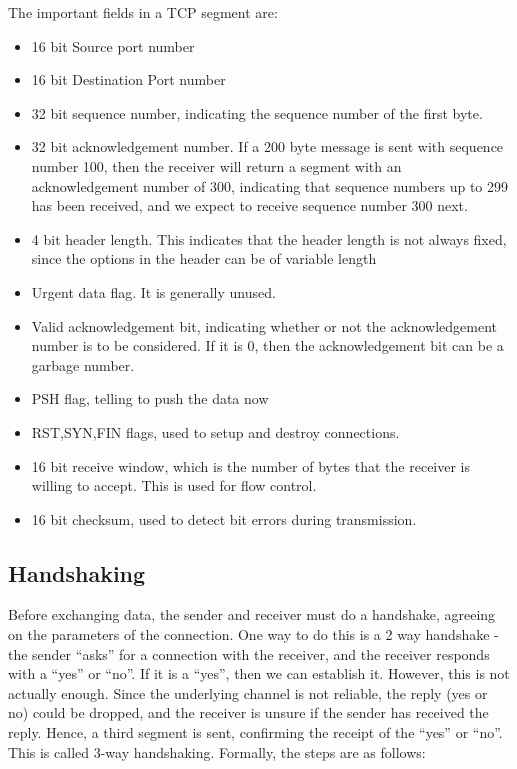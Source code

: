 \documentclass[12pt,letterpaper]{book}
\theoremstyle{definition}
\begin{document}
The important fields in a TCP segment are:

\begin{itemize}
  \item 16 bit Source port number
  \item 16 bit Destination Port number
  \item 32 bit sequence number, indicating the sequence number of the first byte.
  \item 32 bit acknowledgement number. If a 200 byte message is sent with sequence number 100, then the receiver will return a segment with an acknowledgement number of 300, indicating that sequence numbers up to 299 has been received, and we expect to receive sequence number 300 next.
  \item 4 bit header length. This indicates that the header length is not always fixed, since the options in the header can be of variable length
  \item Urgent data flag. It is generally unused.
  \item Valid acknowledgement bit, indicating whether or not the acknowledgement number is to be considered. If it is 0, then the acknowledgement bit can be a garbage number.
  \item PSH flag, telling to push the data now
  \item RST,SYN,FIN flags, used to setup and destroy connections.
  \item 16 bit receive window, which is the number of bytes that the receiver is willing to accept. This is used for flow control.
  \item 16 bit checksum, used to detect bit errors during transmission.
\end{itemize}

\subsection{Handshaking}

Before exchanging data, the sender and receiver must do a handshake, agreeing on the parameters of the connection. One way to do this is a 2 way handshake - the sender ``asks'' for a connection with the receiver, and the receiver responds with a ``yes'' or ``no''. If it is a ``yes'', then we can establish it. However, this is not actually enough. Since the underlying channel is not reliable, the reply (yes or no) could be dropped, and the receiver is unsure if the sender has received the reply. Hence, a third segment is sent, confirming the receipt of the ``yes'' or ``no''. This is called 3-way handshaking. Formally, the steps are as follows:
\end{document}

